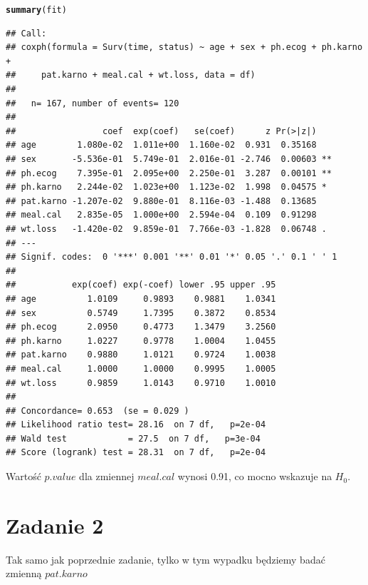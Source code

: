 \documentclass[12pt, a4paper]{article}\usepackage[]{graphicx}\usepackage[]{color}
\makeatletter
\newcommand{\hlstd}[1]{\textcolor[rgb]{0.345,0.345,0.345}{#1}}%
\newcommand{\hlkwd}[1]{\textcolor[rgb]{0.737,0.353,0.396}{\textbf{#1}}}%
\newenvironment{kframe}{%
 \def\at@end@of@kframe{}%
 \ifinner\ifhmode%
  \def\at@end@of@kframe{\end{minipage}}%
  \begin{minipage}{\columnwidth}%
 \fi\fi%
 \def\FrameCommand##1{\hskip\@totalleftmargin \hskip-\fboxsep
 \colorbox{shadecolor}{##1}\hskip-\fboxsep
     \hskip-\linewidth \hskip-\@totalleftmargin \hskip\columnwidth}%
 \MakeFramed {\advance\hsize-\width
   \@totalleftmargin\z@ \linewidth\hsize
   \@setminipage}}%
 {\par\unskip\endMakeFramed%
 \at@end@of@kframe}
\newenvironment{knitrout}{}{} %
\makeatother
\begin{document}
\begin{knitrout}
\begin{kframe}
\begin{alltt}
\hlkwd{summary}\hlstd{(fit)}
\end{alltt}
\begin{verbatim}
## Call:
## coxph(formula = Surv(time, status) ~ age + sex + ph.ecog + ph.karno + 
##     pat.karno + meal.cal + wt.loss, data = df)
## 
##   n= 167, number of events= 120 
## 
##                 coef  exp(coef)   se(coef)      z Pr(>|z|)   
## age        1.080e-02  1.011e+00  1.160e-02  0.931  0.35168   
## sex       -5.536e-01  5.749e-01  2.016e-01 -2.746  0.00603 **
## ph.ecog    7.395e-01  2.095e+00  2.250e-01  3.287  0.00101 **
## ph.karno   2.244e-02  1.023e+00  1.123e-02  1.998  0.04575 * 
## pat.karno -1.207e-02  9.880e-01  8.116e-03 -1.488  0.13685   
## meal.cal   2.835e-05  1.000e+00  2.594e-04  0.109  0.91298   
## wt.loss   -1.420e-02  9.859e-01  7.766e-03 -1.828  0.06748 . 
## ---
## Signif. codes:  0 '***' 0.001 '**' 0.01 '*' 0.05 '.' 0.1 ' ' 1
## 
##           exp(coef) exp(-coef) lower .95 upper .95
## age          1.0109     0.9893    0.9881    1.0341
## sex          0.5749     1.7395    0.3872    0.8534
## ph.ecog      2.0950     0.4773    1.3479    3.2560
## ph.karno     1.0227     0.9778    1.0004    1.0455
## pat.karno    0.9880     1.0121    0.9724    1.0038
## meal.cal     1.0000     1.0000    0.9995    1.0005
## wt.loss      0.9859     1.0143    0.9710    1.0010
## 
## Concordance= 0.653  (se = 0.029 )
## Likelihood ratio test= 28.16  on 7 df,   p=2e-04
## Wald test            = 27.5  on 7 df,   p=3e-04
## Score (logrank) test = 28.31  on 7 df,   p=2e-04
\end{verbatim}
\end{kframe}
\end{knitrout}

Wartość $p.value$ dla zmiennej $meal.cal$ wynosi 0.91, co mocno wskazuje na $H_0$.
\section{Zadanie 2}

Tak samo jak poprzednie zadanie, tylko w tym wypadku będziemy badać zmienną $pat.karno$
\end{document}
